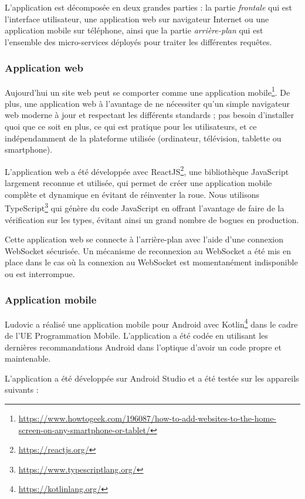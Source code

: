 L'application est décomposée en deux grandes parties : la partie
\textit{frontale} qui est l'interface utilisateur, une application web sur
navigateur Internet ou une application mobile sur téléphone, ainsi que
la partie \textit{arrière-plan} qui est l'ensemble des micro-services
déployés pour traiter les différentes requêtes.

\subsubsection{Application web}

Aujourd'hui un site web peut se comporter comme une application
mobile\footnote{
  \url{https://www.howtogeek.com/196087/how-to-add-websites-to-the-home-screen-on-any-smartphone-or-tablet/}}.
De plus, une application web à l'avantage de ne nécessiter qu'un simple
navigateur web moderne à jour et respectant les différents standards ;
pas besoin d'installer quoi que ce soit en plus, ce qui est pratique
pour les utilisateurs, et ce indépendamment de la plateforme utilisée
(ordinateur, télévision, tablette ou smartphone).

L'application web a été développée avec
ReactJS\footnote{\url{https://reactjs.org/}}, une
bibliothèque JavaScript largement reconnue et utilisée, qui permet de
créer une application mobile complète et dynamique en évitant de
réinventer la roue. Nous utilisons
TypeScript\footnote{\url{https://www.typescriptlang.org/}}
qui génère du code JavaScript en offrant l'avantage de faire de la
vérification sur les types, évitant ainsi un grand nombre de bogues en
production.

Cette application web se connecte à l'arrière-plan avec l'aide d'une
connexion WebSocket sécurisée. Un mécanisme de reconnexion au WebSocket
a été mis en place dans le cas où la connexion au WebSocket est
momentanément indisponible ou est interrompue.

\subsubsection{Application mobile}

Ludovic a réalisé une application mobile pour Android avec
Kotlin\footnote{\url{https://kotlinlang.org/}} dans
le cadre de l'UE Programmation Mobile. L'application a été codée en
utilisant les dernières recommandations Android dans l'optique d'avoir
un code propre et maintenable.

L'application a été développée sur Android Studio et a été testée sur
les appareils suivants :

